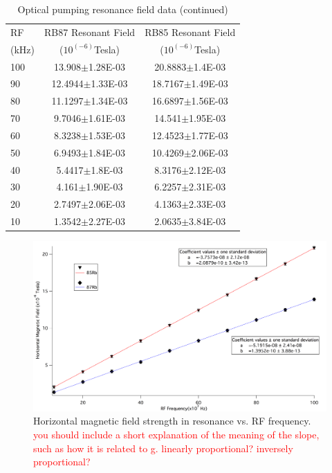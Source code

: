 \documentclass[prb,preprint]{revtex4-1}
\begin{document}
\begin{table}[h]
\centering
\caption{Optical pumping resonance field data (continued)}
\begin{ruledtabular}
\begin{tabular}{ l c c}
RF & RB87 Resonant Field & RB85 Resonant Field\\
(kHz) & ($10^(-6)$Tesla) & ($10^(-6)$Tesla)\\
\hline
100 & 13.908$\pm$1.28E-03 & 20.8883$\pm$1.4E-03\\
90 & 12.4944$\pm$1.33E-03 & 18.7167$\pm$1.49E-03\\
80 & 11.1297$\pm$1.34E-03 & 16.6897$\pm$1.56E-03\\
70 & 9.7046$\pm$1.61E-03 & 14.541$\pm$1.95E-03\\
60 & 8.3238$\pm$1.53E-03 & 12.4523$\pm$1.77E-03\\
50 & 6.9493$\pm$1.84E-03 & 10.4269$\pm$2.06E-03\\
40 & 5.4417$\pm$1.8E-03 & 8.3176$\pm$2.12E-03\\
30 & 4.161$\pm$1.90E-03 & 6.2257$\pm$2.31E-03\\
20 &	2.7497$\pm$2.06E-03 & 4.1363$\pm$2.33E-03\\
10 &	1.3542$\pm$2.27E-03 & 2.0635$\pm$3.84E-03\\

\end{tabular}
\end{ruledtabular}
\label{data2}
\end{table}



\begin{figure}[h]
\centering
\includegraphics[width=16cm]{slopegraph.png}
\caption{Horizontal magnetic field strength in resonance vs. RF frequency. \textcolor{red}{you should include a short explanation of the meaning of the slope, such as how it is related to g. linearly proportional? inversely proportional?} }
\label{both}
\end{figure}
\end{document}
